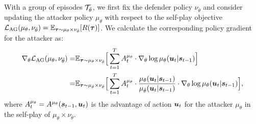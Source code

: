 \documentclass{article}
\theoremstyle{plain}
\theoremstyle{definition}
\theoremstyle{remark}
\begin{document}
With a group of episodes ${\mathcal{T}}_{\bar{\theta}}$, we first fix the defender policy $\nu_{\bar{\theta}}$  and consider updating the attacker policy $\mu_\theta$ with respect to  the self-play objective  ${\mathcal{L}}_\text{AG}(\mu_\theta, \nu_{\bar{\theta}}) =   {\mathbb{E}}_{\bm{\tau}\sim \mu_{\theta} \times \nu_{\bar{\theta}}} [R(\bm{\tau})]$. 
%
We calculate the corresponding policy gradient for the attacker as:
\begin{align}\label{eq:policy-gradient-for-attacker}
   \nabla_\theta {\mathcal{L}}_\text{AG}(\mu_\theta, \nu_{\bar{\theta}}) =& {\mathbb{E}}_{\bm{\tau}\sim \mu_{\theta}\times \nu_{\bar{\theta}}}\Big[\sum_{t=1}^T  A^{\mu_\theta}_t\cdot \nabla_\theta \log \mu_\theta ({\bm{u}}_t| {\bm{s}}_{t-1})\Big] \nonumber \\
   =& {\mathbb{E}}_{\bm{\tau}\sim \mu_{\bar{\theta}}\times \nu_{\bar{\theta}}} \Big[\sum_{t=1}^T  A^{\mu_{\theta}}_t \cdot \frac{\mu_\theta({\bm{u}}_t|{\bm{s}}_{t-1})}{\mu_{\bar{\theta}}({\bm{u}}_t|{\bm{s}}_{t-1})} \cdot \nabla_\theta\log \mu_\theta ({\bm{u}}_t| {\bm{s}}_{t-1}) \Big],
\end{align}
where $A^{\mu_\theta}_{t} = A^{\mu_\theta}({\bm{s}}_{t-1}, {\bm{u}}_t)$ 
is the advantage of action ${\bm{u}}_t$ for the attacker $\mu_\theta$ in the self-play of $\mu_{\theta} \times \nu_{\bar{\theta}}$.
%
%
\end{document}
